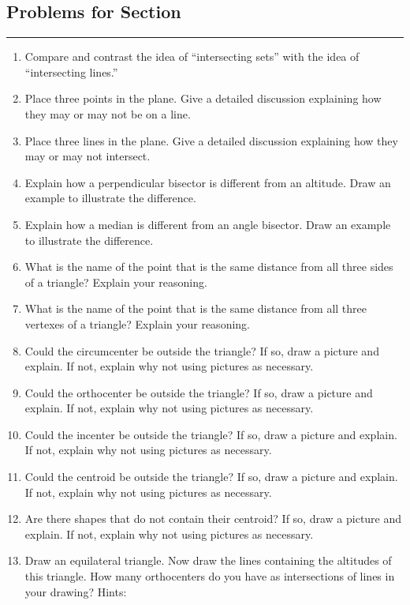 \subsection*{Problems for Section~\thesection}\hrule\vspace{1ex}
\begin{enumerate}
\item Compare and contrast the idea of ``intersecting sets'' with the
  idea of ``intersecting lines.''
\item Place three points in the plane. Give a detailed discussion
  explaining how they may or may not be on a line.
\item Place three lines in the plane. Give a detailed discussion explaining
  how they may or may not intersect.
\item Explain how a perpendicular bisector is different from an
  altitude. Draw an example to illustrate the difference.
\item Explain how a median is different from an angle bisector.  Draw an
  example to illustrate the difference.
\item What is the name of the point that is the same distance from all
  three sides of a triangle? Explain your reasoning.
\item What is the name of the point that is the same distance from all
  three vertexes of a triangle? Explain your reasoning.
\item Could the circumcenter be outside the triangle? If so, draw a
  picture and explain. If not, explain why not using pictures as
  necessary.
\item Could the orthocenter be outside the triangle? If so, draw a
  picture and explain. If not, explain why not using pictures as
  necessary.
\item Could the incenter be outside the triangle? If so, draw a
  picture and explain. If not, explain why not using pictures as
  necessary.
\item Could the centroid be outside the triangle? If so, draw a
  picture and explain. If not, explain why not using pictures as
  necessary.
\item Are there shapes that do not contain their centroid? If so, draw
  a picture and explain. If not, explain why not using pictures as
  necessary.
\item Draw an equilateral triangle. Now draw the lines containing the
  altitudes of this triangle. How many orthocenters do you have as
  intersections of lines in your drawing? Hints:
\begin{enumerate}

\end{enumerate}
\end{enumerate}
